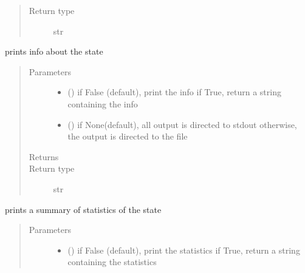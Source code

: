 \documentclass[letterpaper,10pt,english]{sphinxmanual}
\begin{document}
\begin{fulllineitems}
\begin{fulllineitems}
\begin{quote}
\begin{description}
\item[{Return type}] \leavevmode
str

\end{description}\end{quote}

\end{fulllineitems}


\begin{fulllineitems}
\label{\detokenize{Reference:salabim.State.print_info}}
prints info about the state
\begin{quote}\begin{description}
\item[{Parameters}] \leavevmode\begin{itemize}
\item {} 
 () \textendash{} if False (default), print the info
if True, return a string containing the info

\item {} 
 () \textendash{} if None(default), all output is directed to stdout 
otherwise, the output is directed to the file

\end{itemize}

\item[{Returns}] \leavevmode
{}

\item[{Return type}] \leavevmode
str

\end{description}\end{quote}

\end{fulllineitems}


\begin{fulllineitems}
\label{\detokenize{Reference:salabim.State.print_statistics}}
prints a summary of statistics of the state
\begin{quote}\begin{description}
\item[{Parameters}] \leavevmode\begin{itemize}
\item {} 
 () \textendash{} if False (default), print the statistics
if True, return a string containing the statistics


\end{itemize}
\end{description}
\end{quote}
\end{fulllineitems}
\end{fulllineitems}
\end{document}
